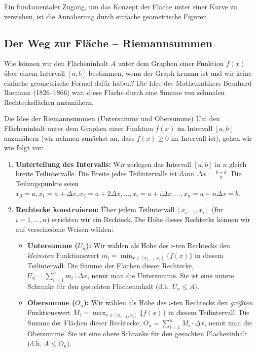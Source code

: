 Ein fundamentaler Zugang, um das Konzept der Fläche unter einer Kurve zu verstehen, ist die Annäherung durch einfache geometrische Figuren.

\subsection{Der Weg zur Fläche – Riemannsummen}
\label{sec:riemannsummen_integral}

Wie können wir den Flächeninhalt $A$ unter dem Graphen einer Funktion $f(x)$ über einem Intervall $[a,b]$ bestimmen, wenn der Graph krumm ist und wir keine einfache geometrische Formel dafür haben? Die Idee des Mathematikers Bernhard Riemann (1826–1866) war, diese Fläche durch eine Summe von schmalen Rechtecksflächen anzunähern.

\begin{merksatzumgebung}{Die Idee der Riemannsummen (Untersumme und Obersumme)}
Um den Flächeninhalt unter dem Graphen einer Funktion $f(x)$ im Intervall $[a,b]$ anzunähern (wir nehmen zunächst an, dass $f(x) \ge 0$ im Intervall ist), gehen wir wie folgt vor:
\begin{enumerate}
    \item \textbf{Unterteilung des Intervalls:} Wir zerlegen das Intervall $[a,b]$ in $n$ gleich breite Teilintervalle. Die Breite jedes Teilintervalls ist dann $\Delta x = \frac{b-a}{n}$. Die Teilungspunkte seien $x_0=a, x_1=a+\Delta x, x_2=a+2\Delta x, \dots, x_i=a+i\Delta x, \dots, x_n=a+n\Delta x=b$.
    \item \textbf{Rechtecke konstruieren:} Über jedem Teilintervall $[x_{i-1}, x_i]$ (für $i=1, \dots, n$) errichten wir ein Rechteck. Die Höhe dieses Rechtecks können wir auf verschiedene Weisen wählen:
        \begin{itemize}
            \item \textbf{Untersumme ($U_n$):} Wir wählen als Höhe des $i$-ten Rechtecks den \textit{kleinsten} Funktionswert $m_i = \min_{x \in [x_{i-1}, x_i]} \{f(x)\}$ in diesem Teilintervall. Die Summe der Flächen dieser Rechtecke, $U_n = \sum_{i=1}^{n} m_i \cdot \Delta x$, nennt man die Untersumme. Sie ist eine untere Schranke für den gesuchten Flächeninhalt (d.h. $U_n \le A$).
            \item \textbf{Obersumme ($O_n$):} Wir wählen als Höhe des $i$-ten Rechtecks den \textit{größten} Funktionswert $M_i = \max_{x \in [x_{i-1}, x_i]} \{f(x)\}$ in diesem Teilintervall. Die Summe der Flächen dieser Rechtecke, $O_n = \sum_{i=1}^{n} M_i \cdot \Delta x$, nennt man die Obersumme. Sie ist eine obere Schranke für den gesuchten Flächeninhalt (d.h. $A \le O_n$).

\end{itemize}
\end{enumerate}
\end{merksatzumgebung}
